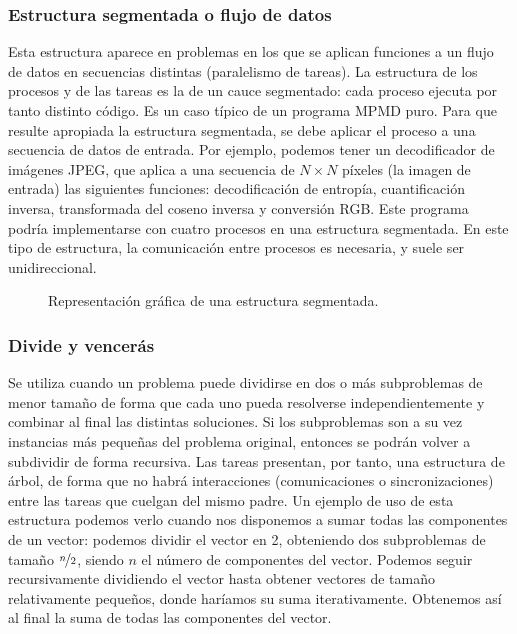 \subsubsection{Estructura segmentada o flujo de datos} 
Esta estructura aparece en problemas en los que se aplican funciones a un flujo de datos en secuencias distintas (paralelismo de tareas). La estructura de los procesos y de las tareas es la de un cauce segmentado: cada proceso ejecuta por tanto distinto código. Es un caso típico de un programa MPMD puro. Para que resulte apropiada la estructura segmentada, se debe aplicar el proceso a una secuencia de datos de entrada.
Por ejemplo, podemos tener un decodificador de imágenes JPEG, que aplica a una secuencia de $N\times N$ píxeles (la imagen de entrada) las siguientes funciones: decodificación de entropía, cuantificación inversa, transformada del coseno inversa y conversión RGB\@. Este programa podría implementarse con cuatro procesos en una estructura segmentada.
En este tipo de estructura, la comunicación entre procesos es necesaria, y suele ser unidireccional.
\begin{figure}[H]
\centering
{}
\caption{Representación gráfica de una estructura segmentada.}
\label{graph:estructura_segmentada}
\end{figure}

\subsubsection{Divide y vencerás} 
Se utiliza cuando un problema puede dividirse en dos o más subproblemas de menor tamaño de forma que cada uno pueda resolverse independientemente y combinar al final las distintas soluciones. Si los subproblemas son a su vez instancias más pequeñas del problema original, entonces se podrán volver a subdividir de forma recursiva. Las tareas presentan, por tanto, una estructura de árbol, de forma que no habrá interacciones (comunicaciones o sincronizaciones) entre las tareas que cuelgan del mismo padre.
Un ejemplo de uso de esta estructura podemos verlo cuando nos disponemos a sumar todas las componentes de un vector: podemos dividir el vector en 2, obteniendo dos subproblemas de tamaño $ \nicefrac{n}{2} $, siendo $n$ el número de componentes del vector. Podemos seguir recursivamente dividiendo el vector hasta obtener vectores de tamaño relativamente pequeños, donde haríamos su suma iterativamente. Obtenemos así al final la suma de todas las componentes del vector.

